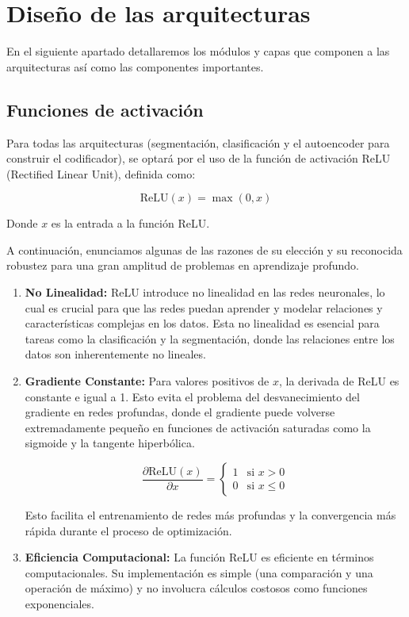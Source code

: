 \section{Diseño de las arquitecturas}

En el siguiente apartado detallaremos los módulos y capas que componen a las arquitecturas así como las componentes importantes. 

\subsection{Funciones de activación}

Para todas las arquitecturas (segmentación, clasificación y el autoencoder para construir el codificador), se optará por el uso de la función de activación ReLU (Rectified Linear Unit), definida como:

$$ \text{ReLU}(x) = \max(0, x) $$

Donde \( x \) es la entrada a la función ReLU.

A continuación, enunciamos algunas de las razones de su elección y su reconocida robustez para una gran amplitud de problemas en aprendizaje profundo.

\begin{enumerate}
	\item \textbf{No Linealidad:}
	ReLU introduce no linealidad en las redes neuronales, lo cual es crucial para que las redes puedan aprender y modelar relaciones y características complejas en los datos. Esta no linealidad es esencial para tareas como la clasificación y la segmentación, donde las relaciones entre los datos son inherentemente no lineales.
	
	\item \textbf{Gradiente Constante:}
	Para valores positivos de $ x $, la derivada de ReLU es constante e igual a 1. Esto evita el problema del desvanecimiento del gradiente en redes profundas, donde el gradiente puede volverse extremadamente pequeño en funciones de activación saturadas como la sigmoide y la tangente hiperbólica.
	
	\[ \frac{\partial \text{ReLU}(x)}{\partial x} = \begin{cases} 
		1 & \text{si } x > 0 \\
		0 & \text{si } x \leq 0 
	\end{cases} \]
	
	Esto facilita el entrenamiento de redes más profundas y la convergencia más rápida durante el proceso de optimización.
	
	\item \textbf{Eficiencia Computacional:}
	La función ReLU es eficiente en términos computacionales. Su implementación es simple (una comparación y una operación de máximo) y no involucra cálculos costosos como funciones exponenciales.
	
\end{enumerate}

